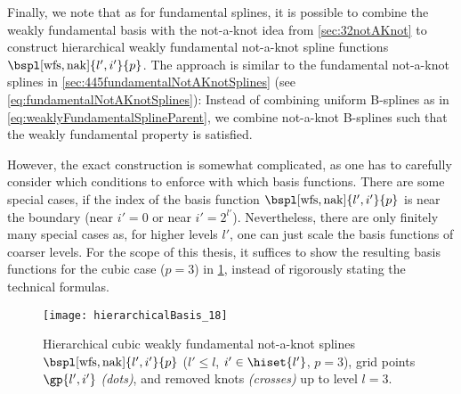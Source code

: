 Finally, we note that as for fundamental splines,
it is possible to combine the weakly fundamental basis
with the not-a-knot idea from \cref{sec:32notAKnot} to construct
hierarchical weakly fundamental not-a-knot spline functions
$\bspl[\wfs,\nak]{l',i'}{p}$.
The approach is similar to the fundamental not-a-knot splines
in \cref{sec:445fundamentalNotAKnotSplines}
(see \cref{eq:fundamentalNotAKnotSplines}):
Instead of combining uniform B-splines as in
\eqref{eq:weaklyFundamentalSplineParent},
we combine not-a-knot B-splines such that the
weakly fundamental property is satisfied.

However, the exact construction is somewhat complicated,
as one has to carefully consider which conditions to enforce
with which basis functions.
There are some special cases, if the index of the basis function
$\bspl[\wfs,\nak]{l',i'}{p}$ is near the boundary
(near $i' = 0$ or near $i' = 2^{l'}$).
Nevertheless, there are only finitely many special cases
as, for higher levels $l'$, one can just scale the basis functions
of coarser levels.
For the scope of this thesis,
it suffices to show the resulting basis functions for
the cubic case ($p = 3$) in
\cref{fig:hierarchicalWeaklyFundamentalNotAKnotSpline},
instead of rigorously stating the technical formulas.

\begin{SCfigure}
  \texttt{[image: hierarchicalBasis\_18]}%
  \caption[%
    Hierarchical weakly fundamental not-a-knot splines%
  ]{%
    Hierarchical cubic weakly fundamental not-a-knot splines
    $\bspl[\wfs,\nak]{l',i'}{p}$
    ($l' \le l$, $i' \in \hiset{l'}$, $p = 3$),
    grid points $\gp{l',i'}$ \emph{(dots)}, and
    removed knots \emph{(crosses)} up to level $l = 3$.%
  }%
  \label{fig:hierarchicalWeaklyFundamentalNotAKnotSpline}%
\end{SCfigure}
